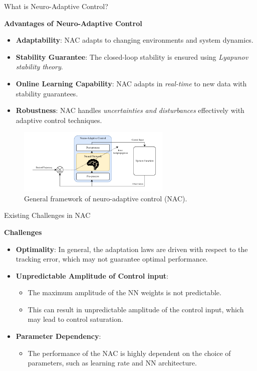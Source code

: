 \documentclass[8pt, aspectratio=169]{beamer}
\begin{document}
\begin{frame}{\insertsubsectionhead}{What is Neuro-Adaptive Control?}

  \textbf{Advantages of Neuro-Adaptive Control}
  \small{
    \begin{itemize}
      \item \textbf{Adaptability}: NAC adapts to changing environments and system dynamics.
      \item \textbf{Stability Guarantee}: The closed-loop stability is ensured using \textit{Lyapunov stability theory}.
      \item \textbf{Online Learning Capability}: NAC adapts in \textit{real-time} to new data with stability guarantees.
      \item \textbf{Robustness}: NAC handles \textit{uncertainties and disturbances} effectively with adaptive control techniques.
    \end{itemize}
  }
  
\begin{figure}
  \label{fig:general_framework}
  \includegraphics[width=0.65\textwidth]{figures/conv_nac.drawio.pdf}
  \caption{General framework of neuro-adaptive control (NAC).}
\end{figure}

\end{frame}

\begin{frame}{\insertsubsectionhead}{Existing Challenges in NAC}
  
  \textbf{Challenges}
  \small{
    \begin{itemize}
      \item \textbf{Optimality}: In general, the adaptation laws are driven with respect to the tracking error, which may not guarantee optimal performance.
      \item \textbf{Unpredictable Amplitude of Control input}: 
        \begin{itemize}
          \item The maximum amplitude of the NN weights is not predictable.
          \item This can result in unpredictable amplitude of the control input, which may lead to control saturation.
        \end{itemize}
      \item \textbf{Parameter Dependency}: 
      \begin{itemize}
        \item The performance of the NAC is highly dependent on the choice of parameters, such as learning rate and NN architecture.
      \end{itemize}
    \end{itemize}
  }

\end{frame}
\end{document}
